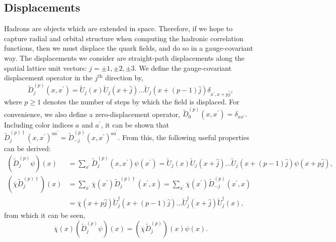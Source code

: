     \subsection{Displacements}
    Hadrons are objects which are extended in space. Therefore, if we hope to capture radial and orbital structure when computing the hadronic correlation functions, then we must displace the quark fields, and do so in a gauge-covariant way. The displacements we consider are straight-path displacements along the spatial lattice unit vectors: $j = \pm 1, \pm 2, \pm 3$. We define the gauge-covariant displacement operator in the $j^{\mathrm{th}}$ direction by,
    \begin{equation}\label{eq:displacement_operator}
        \widetilde{D}_{j}^{(p)}\left(x, x^{\prime}\right)=\widetilde{U}_{j}(x) \widetilde{U}_{j}(x+\hat{j}) \ldots \widetilde{U}_{j}(x+(p-1) \hat{j}) \delta_{x^{\prime}, x+p \hat{j}},
    \end{equation}
    where $p \geq 1$ denotes the number of steps by which the field is displaced. For convenience, we also define a zero-displacement operator, $\widetilde{D}_{0}^{(p)}\left(x, x^{\prime}\right)=\delta_{x x^{\prime}}.$ Including color indices $a$ and $a^\prime$, it can be shown that $\widetilde{D}_{j}^{(p) \dagger}\left(x, x^{\prime}\right)^{a a^{\prime}}=\widetilde{D}_{-j}^{(p)}\left(x, x^{\prime}\right)^{a a^{\prime}}.$ From this, the following useful properties can be derived:
    \begin{equation}
        \begin{aligned}
            \left(\widetilde{D}_{j}^{(p)} \psi\right)(x)&=\sum_{x^{\prime}} \widetilde{D}_{j}^{(p)}\left(x, x^{\prime}\right) \psi\left(x^{\prime}\right)=\widetilde{U}_{j}(x) \widetilde{U}_{j}(x+\hat{j}) \ldots \widetilde{U}_{j}(x+(p-1) \hat{j}) \psi(x+p \hat{j}),\\
            \left(\overline{\chi} \widetilde{D}_{j}^{(p) \dagger}\right)(x)&=\sum_{x^{\prime}} \overline{\chi}\left(x^{\prime}\right) \widetilde{D}_{j}^{(p) \dagger}\left(x^{\prime}, x\right)=\sum_{x^{\prime}} \overline{\chi}\left(x^{\prime}\right) \widetilde{D}_{-j}^{(p)}\left(x^{\prime}, x\right)\\
            &=\overline{\chi}(x+p \hat{j}) \widetilde{U}_{j}^{\dagger}(x+(p-1) \hat{j}) \ldots \widetilde{U}_{j}^{\dagger}(x+\hat{j}) \widetilde{U}_{j}^{\dagger}(x),
        \end{aligned}
    \end{equation}
    from which it can be seen,
    \begin{equation}
        \overline{\chi}(x)\left(\widetilde{D}_{j}^{(p)} \psi\right)(x)=\left(\overline{\chi} \widetilde{D}_{j}^{(p)}\right)(x) \psi(x).
    \end{equation}

